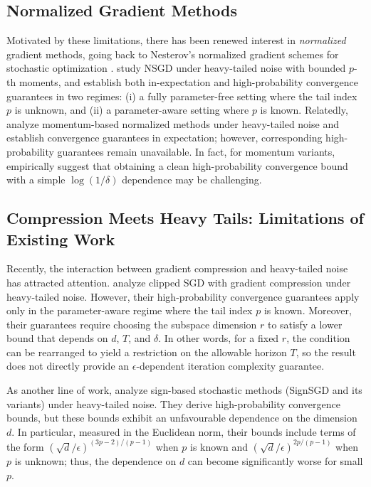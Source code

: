 \documentclass[10pt]{article}
\begin{document}
\subsection{Normalized Gradient Methods}
Motivated by these limitations, there has been renewed interest in \emph{normalized} gradient methods, going back to Nesterov's normalized gradient schemes for stochastic optimization \cite{nesterov1984}.
\citet{huebler2025} study NSGD under heavy-tailed noise with bounded $p$-th moments, and establish both in-expectation and high-probability convergence guarantees in two regimes: (i) a fully parameter-free setting where the tail index $p$ is unknown, and (ii) a parameter-aware setting where $p$ is known.
Relatedly, \citet{liu2025clippingfree,sun2024} analyze momentum-based normalized methods under heavy-tailed noise and establish convergence guarantees in expectation; however, corresponding high-probability guarantees remain unavailable.
In fact, for momentum variants, \citet{huebler2025} empirically suggest that obtaining a clean high-probability convergence bound with a simple $\log(1/\delta)$ dependence may be challenging.



\subsection{Compression Meets Heavy Tails: Limitations of Existing Work}
Recently, the interaction between gradient compression and heavy-tailed noise has attracted attention.  
\citet{chen2024safl_v1} analyze clipped SGD with gradient compression under heavy-tailed noise.
However, their high-probability convergence guarantees apply only in the parameter-aware regime where the tail index $p$ is known.
Moreover, their guarantees require choosing the subspace dimension $r$ to satisfy a lower bound
that depends on $d$, $T$, and $\delta$. In other words, for a fixed $r$, the condition can be rearranged
to yield a restriction on the allowable horizon $T$, so the result does not directly provide an
$\epsilon$-dependent iteration complexity guarantee.

As another line of work, 
\citet{kornilov2025sign_v1} analyze sign-based stochastic
methods (SignSGD and its variants) under heavy-tailed noise. They derive high-probability
convergence bounds, but these bounds exhibit an unfavourable dependence on the dimension $d$.
In particular, measured in the Euclidean norm, their bounds include terms of the form $(\sqrt{d}/\epsilon)^{(3p-2)/(p-1)}$ when $p$ is known and $(\sqrt{d}/\epsilon)^{2p/(p-1)}$ when $p$ is unknown; thus, the dependence on $d$ can become significantly worse for small $p$.
\end{document}
